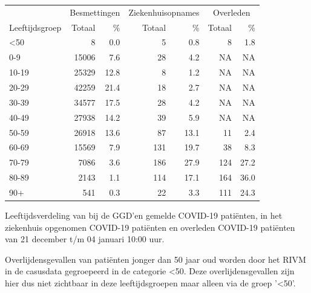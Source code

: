 \documentclass[
  english,
  man,floatsintext]{apa6}
\begin{document}
\begin{table}
\centering\begingroup\fontsize{11}{13}\selectfont

\begin{threeparttable}
\begin{tabular}{lrrrrrr}
\toprule
\multicolumn{1}{c}{ } & \multicolumn{2}{c}{Besmettingen} & \multicolumn{2}{c}{Ziekenhuisopnames} & \multicolumn{2}{c}{Overleden} \\
\cmidrule(l{3pt}r{3pt}){2-3} \cmidrule(l{3pt}r{3pt}){4-5} \cmidrule(l{3pt}r{3pt}){6-7}
Leeftijdsgroep & Totaal & \% & Totaal & \% & Totaal & \%\\
\midrule
<50 & 8 & 0.0 & 5 & 0.8 & 8 & 1.8\\
0-9 & 15006 & 7.6 & 28 & 4.2 & NA & NA\\
10-19 & 25329 & 12.8 & 8 & 1.2 & NA & NA\\
20-29 & 42259 & 21.4 & 18 & 2.7 & NA & NA\\
30-39 & 34577 & 17.5 & 28 & 4.2 & NA & NA\\
40-49 & 27938 & 14.2 & 39 & 5.9 & NA & NA\\
50-59 & 26918 & 13.6 & 87 & 13.1 & 11 & 2.4\\
60-69 & 15569 & 7.9 & 131 & 19.7 & 38 & 8.3\\
70-79 & 7086 & 3.6 & 186 & 27.9 & 124 & 27.2\\
80-89 & 2143 & 1.1 & 114 & 17.1 & 164 & 36.0\\
90+ & 541 & 0.3 & 22 & 3.3 & 111 & 24.3\\
\bottomrule
\end{tabular}
\begin{tablenotes}
\item[1] Leeftijdsverdeling van bij de GGD’en gemelde COVID-19 patiënten, in het ziekenhuis opgenomen COVID-19 patiënten en overleden COVID-19 patiënten van 21 december t/m 04 januari 10:00 uur.
\item[2] Overlijdensgevallen van patiënten jonger dan 50 jaar oud worden door het RIVM in de casusdata gegroepeerd in de categorie <50. Deze overlijdensgevallen zijn hier dus niet zichtbaar in deze leeftijdsgroepen maar alleen via de groep '<50'.
\end{tablenotes}
\end{threeparttable}
\endgroup{}
\end{table}

\newpage
\end{document}

